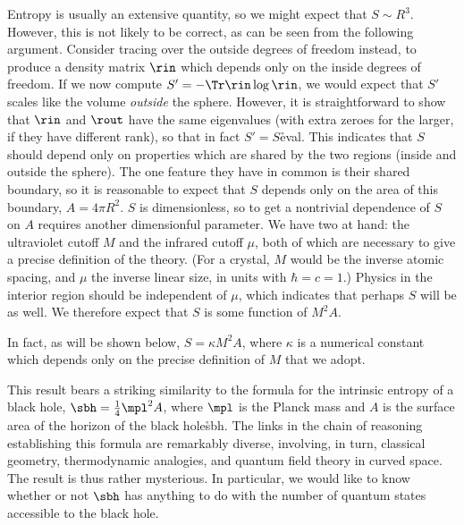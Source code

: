 Entropy is usually an extensive quantity, so we might expect that
$S\sim R^3$.  However, this is not likely to be correct, as can be seen
from the following argument.  Consider tracing over the outside degrees of
freedom instead, to produce a density matrix $\rin$ which depends only on
the inside degrees of freedom.  If we now compute $S'=-\Tr\rin\log\rin$,
we would expect that $S'$ scales like the volume {\it outside} the sphere.
However, it is straightforward to show that $\rin$ and $\rout$ have the
same eigenvalues (with extra zeroes for the larger, if they have different
rank), so that in fact $S'=S$\r{eval}.  This indicates that $S$ should
depend only on properties which are shared by the two regions (inside and
outside the sphere).  The one feature they have in common is their shared
boundary, so it is reasonable to expect that $S$ depends only on the area of
this boundary, $A=4\pi R^2$.  $S$ is dimensionless, so to get a nontrivial
dependence of $S$ on $A$ requires another dimensionful parameter.
We have two at hand: the ultraviolet cutoff $M$ and the infrared
cutoff $\mu$, both of which are necessary to give a precise definition
of the theory.  (For a crystal, $M$ would be the inverse atomic
spacing, and $\mu$ the inverse linear size, in units with $\hbar=c=1$.)
Physics in the interior region should be independent of $\mu$, which
indicates that perhaps $S$ will be as well.  We therefore expect that
$S$ is some function of $M^2\!A$.

In fact, as will be shown below, $S=\kappa M^2\!A$, where $\kappa$
is a numerical constant which depends only on the precise definition of
$M$ that we adopt.

This result bears a striking similarity to the formula for the intrinsic
entropy of a black hole, $\sbh=\frac14\mpl^2 A$, where $\mpl$ is the Planck
mass and $A$ is the surface area of the horizon of the black hole\r{sbh}.
The links in the chain of reasoning establishing this formula are remarkably
diverse, involving, in turn, classical geometry, thermodynamic analogies, and
quantum field theory in curved space.  The result is thus rather mysterious.
In particular, we would like to know whether or not $\sbh$ has anything to
do with the number of quantum states accessible to the black hole.

